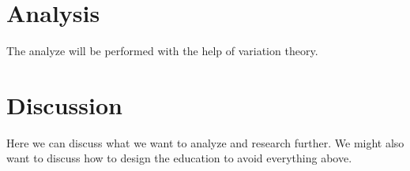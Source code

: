\documentclass[twocolumn]{article}
\begin{document}








\section{Analysis}

The analyze will be performed with the help of variation theory. 

\section{Discussion}

Here we can discuss what we want to analyze and research further. We might also want to discuss how to design the education to avoid everything above.

\printbibliography
\end{document}
